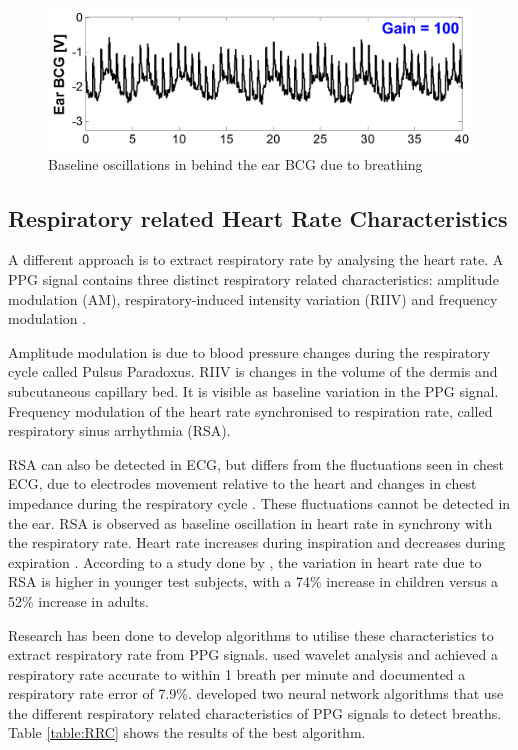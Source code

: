 \begin{figure}[h]
   \centering
   \includegraphics[scale=0.3]{figs/BCGbreathing}
   \caption{Baseline oscillations in behind the ear BCG due to breathing \citep{da2010ear}}
   \label{fig:BCGbreathing}
\end{figure}

\subsection{Respiratory related Heart Rate Characteristics}
A different approach is to extract respiratory rate by analysing the heart rate. A PPG signal contains three distinct respiratory related characteristics: amplitude modulation (AM), respiratory-induced intensity variation (RIIV) and frequency modulation \citep{johansson2003neural}.

\medskip
Amplitude modulation is due to blood pressure changes during the respiratory cycle called Pulsus Paradoxus. RIIV is changes in the volume of the dermis and subcutaneous capillary bed. It is visible as baseline variation in the PPG signal.  Frequency modulation of the heart rate synchronised to respiration rate, called respiratory sinus arrhythmia (RSA).

\medskip
RSA can also be detected in ECG, but differs from the fluctuations seen in chest ECG, due to electrodes movement relative to the heart and changes in chest impedance during the respiratory cycle \citep{moody1986clinical}. These fluctuations cannot be detected in the ear. RSA is observed as baseline oscillation in heart rate in synchrony with the respiratory rate. Heart rate increases during inspiration and decreases during expiration \citep{yasuma2004_RSA}. According to a study done by \cite{stratton2003effects}, the variation in heart rate due to RSA is higher in younger test subjects, with a 74\% increase in children versus a 52\% increase in adults.

\medskip
Research has been done to develop algorithms to utilise these characteristics to extract respiratory rate from PPG signals. \cite{clifton2007measurement} used wavelet analysis and achieved a respiratory rate accurate to within 1 breath per minute and \cite{leonard2006fully} documented a respiratory rate error of 7.9\%. \cite{johansson2003neural} developed two neural network algorithms that use the different respiratory related characteristics of PPG signals to detect breaths. Table \ref{table:RRC} shows the results of the best algorithm.

